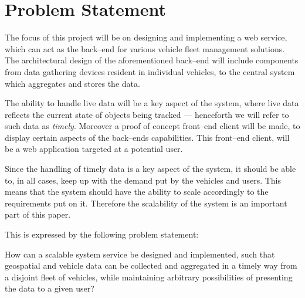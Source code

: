 \section{Problem Statement}\label{sec:problem_statement}

The focus of this project will be on designing and implementing a web service,
which can act as the back--end for various vehicle fleet management solutions.
The architectural design of the aforementioned back--end will include components
from data gathering devices resident in individual vehicles,
to the central system which aggregates and stores the data.

The ability to handle live data will be a key aspect of the system,
where live data reflects the current state of objects being tracked
--- henceforth we will refer to such data as \textit{timely}.
Moreover a proof of concept front--end client will be made,
to display certain aspects of the back--ends capabilities.
This front--end client, will be a web application targeted at a potential user.

Since the handling of timely data is a key aspect of the system,
it should be able to, in all cases, keep up with the demand put by the vehicles and users.
This means that the system should have the ability to scale accordingly to the requirements put on it.
Therefore the scalability of the system is an important part of this paper.

\bigskip\noindent
This is expressed by the following problem statement:

\medskip
{\addtolength{\leftskip}{10mm}\addtolength{\rightskip}{10mm}\noindent\hrulefill\it

\noindent How can a scalable system service be designed and implemented,
such that geospatial and vehicle data can be collected and aggregated in a timely way from a disjoint fleet of vehicles,
while maintaining arbitrary possibilities of presenting the data to a given user?

\noindent\hrulefill

}
